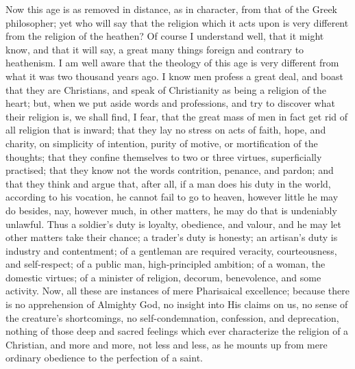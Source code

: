 Now this age is as removed in distance, as in
character, from that of the Greek philosopher; yet who
will say that the religion which it acts upon is very
different from the religion of the heathen? Of course I
understand well, that it might know, and that it will
say, a great many things foreign and contrary to
heathenism. I am well aware that the theology of this age
is very different from what it was two thousand years
ago. I know men profess a great deal, and boast that they
are Christians, and speak of Christianity as being a
religion of the heart; but, when we put aside words and
professions, and try to discover what their religion is,
we shall find, I fear, that the great mass of men in fact
get rid of all religion that is inward; that they lay no
stress on acts of faith, hope, and charity, on simplicity
of intention, purity of motive, or mortification of the
thoughts; that they confine themselves to two or three
virtues, superficially practised; that they know not the
words contrition, penance, and pardon; and that they
think and argue that, after all, if a man does his duty
in the world, according to his vocation, he cannot fail
to go to heaven, however little he may do besides, nay,
however much, in other matters, he may do that is
undeniably unlawful. Thus a soldier's duty is loyalty,
obedience, and valour, and he may let other matters take
their chance; a trader's duty is honesty; an artisan's
duty is industry and contentment; of a gentleman are
required veracity, courteousness, and self-respect; of a
public man, high-principled ambition; of a woman, the
domestic virtues; of a minister of religion, decorum,
benevolence, and some activity. Now, all these are
instances of mere Pharisaical excellence; because there
is no apprehension of Almighty God, no insight into His
claims on us, no sense of the creature's shortcomings, no
self-condemnation, confession, and deprecation, nothing
of those deep and sacred feelings which ever characterize
the religion of a Christian, and more and more, not less
and less, as he mounts up from mere ordinary obedience to
the perfection of a saint.

